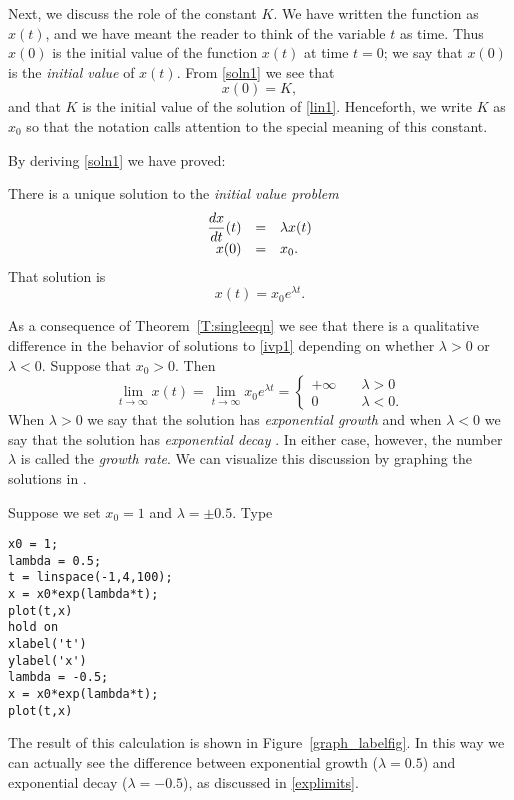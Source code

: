 \documentclass{ximera}
\begin{document}
Next, we discuss the role of the constant $K$.  We have written
the function as $x(t)$, and we have meant the reader to think of
the variable $t$ as time.  Thus $x(0)$ is the initial value of
the function $x(t)$ at time $t=0$; we say that $x(0)$ is the
{\em initial value\/} of $x(t)$.
From \eqref{soln1} we see that
\[
x(0) = K,
\]
and that $K$ is the initial value of the solution of \eqref{lin1}.
Henceforth, we write $K$ as $x_0$ so that the notation calls
attention to the special meaning of this constant.

By deriving \eqref{soln1} we have proved:
\begin{theorem}  \label{T:singleeqn}
There is a unique solution to the {\em initial value problem\/}
\arraystart
\begin{equation} \label{ivp1}
\begin{array}{rcl}
\displaystyle \frac{dx}{dt}(t) & = & \lambda x(t) \\
x(0) & = & x_0.
\end{array}
\end{equation}
\arrayfinish
That solution is
\[
x(t) = x_0e^{\lambda t}.
\]
\end{theorem}

As a consequence of Theorem~\ref{T:singleeqn} we see that there
is a qualitative difference in the behavior of solutions to
\eqref{ivp1} depending on whether $\lambda>0$ or $\lambda<0$.
Suppose that $x_0>0$.  Then
\begin{equation}  \label{explimits}
\lim_{t\to\infty} x(t) = \lim_{t\to\infty} x_0e^{\lambda t} =\left\{
\begin{array}{rl} +\infty & \quad\lambda>0 \\ 0 & \quad\lambda<0 . \end{array}
\right.
\end{equation}
When $\lambda>0$ we say that the solution has {\em exponential
growth\/} and when $\lambda< 0$ we say
that the solution has {\em exponential decay\/}
.  In either case, however, the
number $\lambda$ is called the {\em growth rate\/}.  We can visualize this discussion by graphing the
solutions in \Matlabp.

Suppose we set $x_0=1$ and $\lambda=\pm 0.5$.  Type
\begin{verbatim}
x0 = 1;
lambda = 0.5;
t = linspace(-1,4,100);
x = x0*exp(lambda*t);
plot(t,x)
hold on
xlabel('t')
ylabel('x')
lambda = -0.5;
x = x0*exp(lambda*t);
plot(t,x)
\end{verbatim}
The result of this calculation is shown in
Figure~\ref{graph_labelfig}.  In this way we can actually see
the difference between exponential growth ($\lambda=0.5$) and
exponential decay ($\lambda=-0.5$), as discussed in
\eqref{explimits}.
\end{document}
